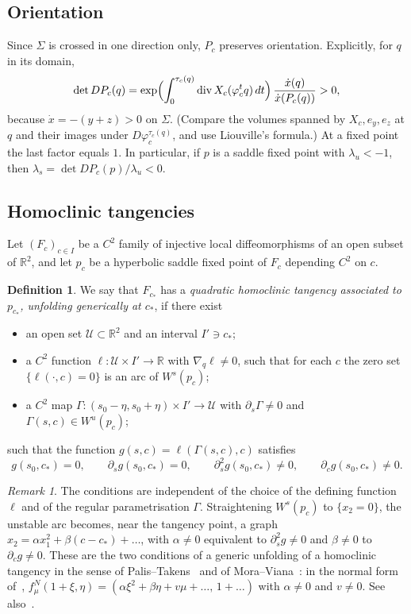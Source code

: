 \documentclass[11pt]{amsart}
\theoremstyle{definition}
\newtheorem{definition}[thm]{Definition}
\theoremstyle{remark}
\newtheorem{remark}[thm]{Remark}
\newcommand{\R}{\mathbb{R}}
\newcommand{\Wu}{W^u}
\newcommand{\Ws}{W^s}
\newcommand{\cs}{c_*}
\begin{document}
\subsection{Orientation}
Since $\Sigma$ is crossed in one direction only, $P_c$ preserves orientation. Explicitly, for $q$ in its
domain,
\[
\det DP_c(q)=\exp\Bigl(\int_0^{\tau_c(q)}\operatorname{div}X_c(\varphi^t_cq)\,dt\Bigr)\,
\frac{\dot x(q)}{\dot x(P_c(q))}>0 ,
\]
because $\dot x=-(y+z)>0$ on $\Sigma$. (Compare the volumes spanned by $X_c,e_y,e_z$ at $q$ and their images
under $D\varphi_c^{\tau_c(q)}$, and use Liouville's formula.) At a fixed point the last factor equals $1$.
In particular, if $p$ is a saddle fixed point with $\lambda_u<-1$, then
$\lambda_s=\det DP_c(p)/\lambda_u<0$.

\subsection{Homoclinic tangencies}
Let $(F_c)_{c\in I}$ be a $C^2$ family of injective local diffeomorphisms of an open subset of $\R^2$,
and let $p_c$ be a hyperbolic saddle fixed point of $F_c$ depending $C^2$ on $c$.

\begin{definition}\label{def:tangency}
We say that $F_{\cs}$ has a \emph{quadratic homoclinic tangency associated to $p_{\cs}$, unfolding
generically at $\cs$}, if there exist
\begin{itemize}[leftmargin=*]
\item an open set $\mathcal U\subset\R^2$ and an interval $I'\ni\cs$;
\item a $C^2$ function $\ell\colon\mathcal U\times I'\to\R$ with $\nabla_q\ell\neq0$, such that for each
$c$ the zero set $\{\ell(\cdot,c)=0\}$ is an arc of $\Ws(p_c)$;
\item a $C^2$ map $\Gamma\colon(s_0-\eta,s_0+\eta)\times I'\to\mathcal U$ with $\partial_s\Gamma\neq0$ and
$\Gamma(s,c)\in\Wu(p_c)$;
\end{itemize}
such that the function $g(s,c)=\ell(\Gamma(s,c),c)$ satisfies
\[
g(s_0,\cs)=0,\qquad \partial_s g(s_0,\cs)=0,\qquad \partial_s^2 g(s_0,\cs)\neq0,\qquad
\partial_c g(s_0,\cs)\neq0 .
\]
\end{definition}

\begin{remark}\label{rem:normalform}
The conditions are independent of the choice of the defining function $\ell$ and of the regular
parametrisation $\Gamma$. Straightening $\Ws(p_c)$ to $\{x_2=0\}$, the unstable arc becomes, near the
tangency point, a graph $x_2=\alpha x_1^2+\beta(c-\cs)+\dots$, with $\alpha\neq0$ equivalent to
$\partial_s^2g\neq0$ and $\beta\neq0$ to $\partial_c g\neq0$. These are the two conditions of a generic
unfolding of a homoclinic tangency in the sense of Palis--Takens~\cite{PT93} and of
Mora--Viana~\cite[p.~6]{MV93}: in the normal form of~\cite{MV93},
$f^N_\mu(1+\xi,\eta)=(\alpha\xi^2+\beta\eta+v\mu+\dots,\,1+\dots)$ with $\alpha\neq0$ and $v\neq0$. See
also~\cite[Def.~4]{WZ09}.
\end{remark}
\end{document}
